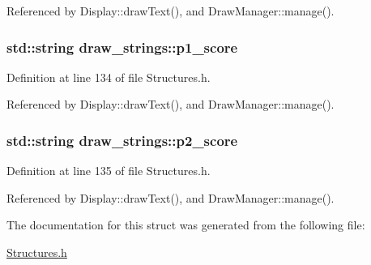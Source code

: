 Referenced by Display\-::draw\-Text(), and Draw\-Manager\-::manage().

\hypertarget{structdraw__strings_a0d59a0f9e78f1c539dbe7959dcd9c3bb}{
\subsubsection[{p1\-\_\-score}]{\setlength{\rightskip}{0pt plus 5cm}std\-::string draw\-\_\-strings\-::p1\-\_\-score}}\label{structdraw__strings_a0d59a0f9e78f1c539dbe7959dcd9c3bb}


Definition at line 134 of file Structures.\-h.



Referenced by Display\-::draw\-Text(), and Draw\-Manager\-::manage().

\hypertarget{structdraw__strings_a749fa74ab7403f436f100c546b073be8}{
\subsubsection[{p2\-\_\-score}]{\setlength{\rightskip}{0pt plus 5cm}std\-::string draw\-\_\-strings\-::p2\-\_\-score}}\label{structdraw__strings_a749fa74ab7403f436f100c546b073be8}


Definition at line 135 of file Structures.\-h.



Referenced by Display\-::draw\-Text(), and Draw\-Manager\-::manage().



The documentation for this struct was generated from the following file\-:\begin{DoxyCompactItemize}
\item 
\hyperlink{Structures_8h}{Structures.\-h}\end{DoxyCompactItemize}
